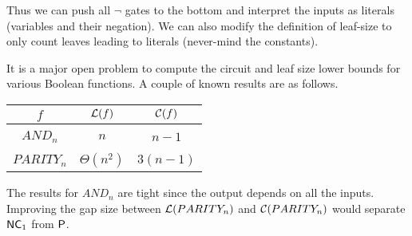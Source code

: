 \documentclass[11pt]{article}
\begin{document}
Thus we can push all $\lnot$ gates to the bottom and interpret the inputs as literals (variables and their negation). We can also modify the definition of leaf-size to only count leaves leading to literals (never-mind the constants).

\begin{example}
	It is a major open problem to compute the circuit and leaf size lower bounds for various Boolean functions. A couple of known results are as follows.
	\begin{center}
		\begin{tabular}{c|c|c}
			$f$ 		& $\operatorname*{\mathcal{L}}(f)$ 	& $\operatorname*{\mathcal{C}}(f)$\\ \hline
			&&\\[-1em]
			$AND_n$ 	& $n$ 				& $n-1$\\ \hline
			&&\\[-1em]
			$PARITY_n$ 	& $\Theta\left(n^2\right)$ 	& $3(n-1)$\\
		\end{tabular}
	\end{center}
	The results for $AND_n$ are tight since the output depends on all the inputs. Improving the gap size between $\operatorname*{\mathcal{L}}(PARITY_n)$ and $\operatorname*{\mathcal{C}}(PARITY_n)$ would separate $\mathsf{NC}_1$ from $\mathsf{P}$.
\end{example}
\end{document}
